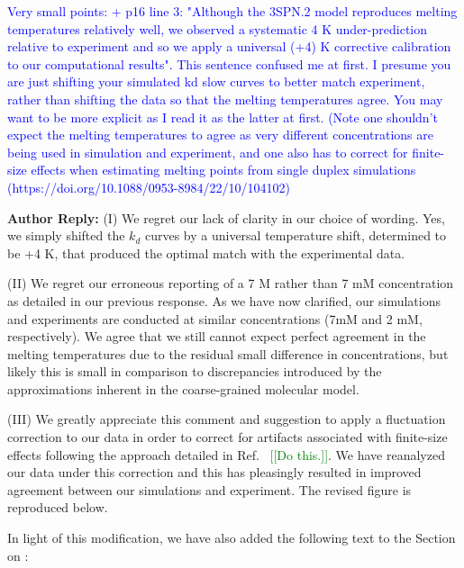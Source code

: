 \documentclass[11pt,a4paper]{letter} %
\newcommand*{\rood}[1]{{\color{red}{#1}}}
\newcommand*{\noteg}[1]{\textcolor{green}{[[#1]]}}		%
\newcommand*{\noter}[1]{{\color{red}{[[#1]]}}}
\begin{document}
\textcolor{blue}{Very small points:
+ p16 line 3: "Although the 3SPN.2 model reproduces melting temperatures relatively well, we observed a systematic 4 K under-prediction relative to experiment and so we apply a universal (+4) K corrective calibration to our computational results". This sentence confused me at first. I presume you are just shifting your simulated kd slow curves to better match experiment, rather than shifting the data so that the melting temperatures agree. You may want to be more explicit as I read it as the latter at first. (Note one shouldn't expect the melting temperatures to agree as very different concentrations are being used in simulation and experiment, and one also has to correct for finite-size effects when estimating melting points from single duplex simulations (https://doi.org/10.1088/0953-8984/22/10/104102)}

\textbf{Author Reply:}   (I) We regret our lack of clarity in our choice of wording. Yes, we simply shifted the $k_d$ curves by a universal temperature shift, determined to be +4 K, that produced the optimal match with the experimental data. 

(II) We regret our erroneous reporting of a 7 M rather than 7 mM concentration as detailed in our previous response. As we have now clarified, our simulations and experiments are conducted at similar concentrations (7mM and 2 mM, respectively). We agree that we still cannot expect perfect agreement in the melting temperatures due to the residual small  difference in concentrations, but likely this is small in comparison to discrepancies introduced by the approximations inherent in the coarse-grained molecular model.

(III) We greatly appreciate this comment and suggestion to apply a fluctuation correction to our data in order to correct for artifacts associated with finite-size effects following the approach detailed in Ref.~\noter{Add https://doi.org/10.1088/0953-8984/22/10/104102 to bibliography and cite here using citep.} \noteg{Do this.}. We have reanalyzed our data under this correction and this has pleasingly resulted in improved agreement between our simulations and experiment. The revised figure is reproduced below.

\noter{Insert figure and caption here. Probably you also need some edits to the caption to (i) eliminate / change the +4 K correction, (ii) state that a fluctuation correction has been applied.}

In light of this modification, we have also added the following text to the Section \rood{X.X.X} on \rood{p.~XX}: \noter{Maybe append this to the paragraph on p.~15 ending ``...a function of time $f_{unfrayed}(t) = exp(-k_d^{fast}t)$.'' }
\end{document}
